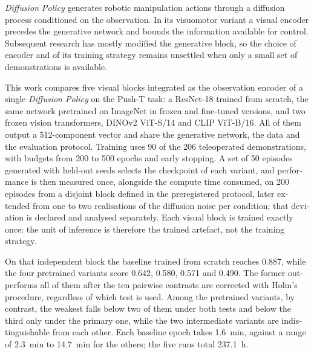 
\begin{otherlanguage}{english}

\textit{Diffusion Policy} generates robotic manipulation actions through a diffusion process
conditioned on the observation. In its visuomotor variant a visual encoder precedes the
generative network and bounds the information available for control. Subsequent research has
mostly modified the generative block, so the choice of encoder and of its training strategy
remains unsettled when only a small set of demonstrations is available.

This work compares five visual blocks integrated as the observation encoder of a single
\textit{Diffusion Policy} on the Push-T task: a ResNet-18 trained from scratch, the same
network pretrained on ImageNet in frozen and fine-tuned versions, and two frozen vision
transformers, DINOv2 ViT-S/14 and CLIP ViT-B/16. All of them output a \num{512}-component
vector and share the generative network, the data and the evaluation protocol. Training uses
\num{90} of the \num{206} teleoperated demonstrations, with budgets from \num{200} to
\num{500} epochs and early stopping. A set of \num{50} episodes generated with held-out seeds
selects the checkpoint of each variant, and performance is then measured once, alongside the
compute time consumed, on \num{200} episodes from a disjoint block defined in the
preregistered protocol, later extended from one to two realisations of the diffusion noise
per condition; that deviation is declared and analysed separately. Each visual block is
trained exactly once: the unit of inference is therefore the trained artefact, not the
training strategy.

On that independent block the baseline trained from scratch reaches \num{0.887}, while the
four pretrained variants score \num{0.642}, \num{0.580}, \num{0.571} and \num{0.490}. The
former outperforms all of them after the ten pairwise contrasts are corrected with Holm's
procedure, regardless of which test is used. Among the pretrained variants, by contrast,
the weakest falls below two of them under both tests and below the third only under the
primary one, while the two intermediate variants are indistinguishable from each other. Each
baseline epoch takes \SI{1.6}{\minute}, against a range of \SI{2.3}{\minute} to
\SI{14.7}{\minute} for the others; the five runs total \SI{237.1}{\hour}.


\end{otherlanguage}
